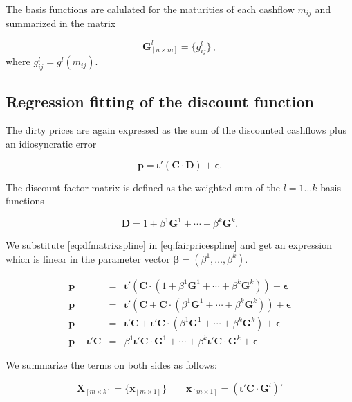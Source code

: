 The basis functions are calulated for the maturities of each cashflow $m_{ij}$ and summarized in the matrix

\begin{equation*}
\label{eq:basisfctmatrix}	
\bm{G}_{\left [n \times m\right]}^l= \{g_{ij}^l\}\,,
\end{equation*}
where $g_{ij}^l=g^l(m_{ij})$.



\subsection{Regression fitting of the discount function}

The dirty prices are again expressed as the sum of the discounted cashflows plus an idiosyncratic error

\begin{equation}
  \label{eq:fairpricespline}
  \bm{p}= \bm{\iota}'\left(\bm{C}\cdot\bm{D}\right)+ \bm{\epsilon}.
\end{equation}

The discount factor matrix is defined as the weighted sum of the $l=1\dots k$ basis functions

\begin{equation}
  \label{eq:dfmatrixspline}
   \bm{D}=1+\beta^1\bm{G}^1+\cdots + \beta^k\bm{G}^k.
\end{equation}

We substitute \eqref{eq:dfmatrixspline} in \eqref{eq:fairpricespline} and get an expression which is linear in the parameter vector $\bm{\beta}=(\beta^1,\dots,\beta^k)$.

\begin{eqnarray*}
  \label{eq:splineparam}
  \bm{p} &=& \bm{\iota}'\left(\bm{C}\cdot\left(1+\beta^1\bm{G}^1+\cdots+\beta^k\bm{G}^k\right)\right)+\bm{\epsilon}\\
  \bm{p} &=& \bm{\iota}'\left(\bm{C}+\bm{C}\cdot\left(\beta^1\bm{G}^1+\cdots+\beta^k\bm{G}^k\right)\right)+\bm{\epsilon}\\
  \bm{p} &=& \bm{\iota}'\bm{C}+\bm{\iota}'\bm{C}\cdot\left(\beta^1\bm{G}^1+\cdots+\beta^k\bm{G}^k\right)+\bm{\epsilon}\\
  \bm{p}- \bm{\iota}'\bm{C} &=& \beta^1\bm{\iota}'\bm{C}\cdot\bm{G}^1+\cdots+\beta^k\bm{\iota}'\bm{C}\cdot\bm{G}^k+\bm{\epsilon}
\end{eqnarray*}


We summarize the terms on both sides as follows:


\begin{equation*}
\bm{X}_{\left[m \times k\right]}=\{ \bm{x}_{\left[m \times 1\right]} \} \qquad  \bm{x}_{\left[m \times 1\right]} = \left( \bm{\iota}'\bm{C}\cdot\bm{G}^l\right)'
\end{equation*}


